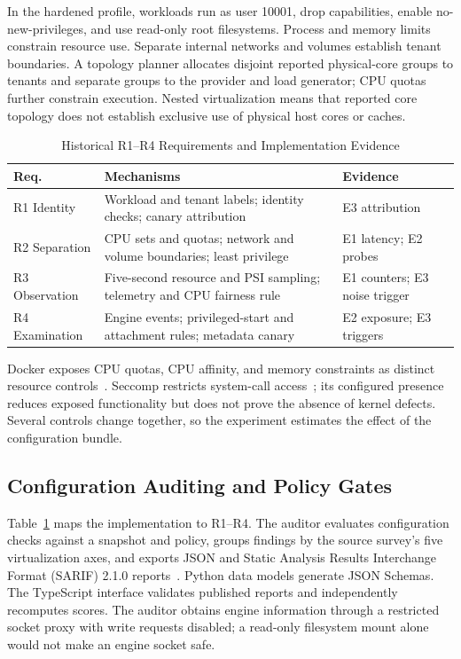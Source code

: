 \documentclass[conference,letterpaper]{IEEEtran}
\begin{document}
In the hardened profile, workloads run as user 10001, drop capabilities, enable no-new-privileges, and use read-only root filesystems. Process and memory limits constrain resource use. Separate internal networks and volumes establish tenant boundaries. A topology planner allocates disjoint reported physical-core groups to tenants and separate groups to the provider and load generator; CPU quotas further constrain execution. Nested virtualization means that reported core topology does not establish exclusive use of physical host cores or caches.

\begin{table}[t]
\caption{Historical R1--R4 Requirements and Implementation Evidence}
\label{tab:requirements}
\centering
\footnotesize
\renewcommand{\arraystretch}{1.14}
\begin{tabular}{@{}>{\raggedright\arraybackslash}p{}>{\raggedright\arraybackslash}p{}>{\raggedright\arraybackslash}p{}@{}}
\toprule
Req. & Mechanisms & Evidence \\ \midrule
R1 Identity & Workload and tenant labels; identity checks; canary attribution & E3 attribution \\
R2 Separation & CPU sets and quotas; network and volume boundaries; least privilege & E1 latency; E2 probes \\
R3 Observation & Five-second resource and PSI sampling; telemetry and CPU fairness rule & E1 counters; E3 noise trigger \\
R4 Examination & Engine events; privileged-start and attachment rules; metadata canary & E2 exposure; E3 triggers \\
\bottomrule
\end{tabular}
\end{table}

Docker exposes CPU quotas, CPU affinity, and memory constraints as distinct resource controls~\cite{dockerresources}. Seccomp restricts system-call access~\cite{dockerseccomp}; its configured presence reduces exposed functionality but does not prove the absence of kernel defects. Several controls change together, so the experiment estimates the effect of the configuration bundle.

\subsection{Configuration Auditing and Policy Gates}
Table~\ref{tab:requirements} maps the implementation to R1--R4. The auditor evaluates configuration checks against a snapshot and policy, groups findings by the source survey's five virtualization axes, and exports JSON and Static Analysis Results Interchange Format (SARIF) 2.1.0 reports~\cite{sarif}. Python data models generate JSON Schemas. The TypeScript interface validates published reports and independently recomputes scores. The auditor obtains engine information through a restricted socket proxy with write requests disabled; a read-only filesystem mount alone would not make an engine socket safe.
\end{document}
